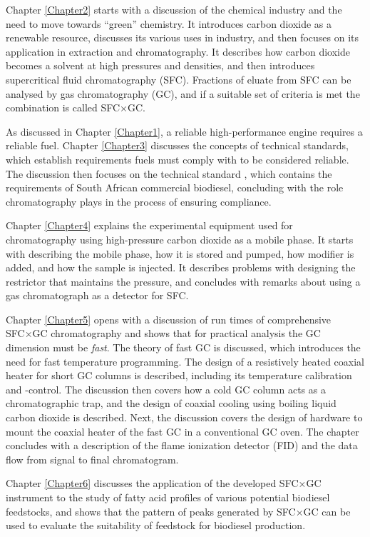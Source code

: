 Chapter \ref{Chapter2} starts with a discussion of the chemical industry and the
need to move towards ``green'' chemistry. It introduces carbon dioxide as a
renewable resource, discusses its various uses in industry, and then focuses on
its application in extraction and chromatography. It describes how carbon
dioxide becomes a solvent at high pressures and densities, and then introduces
supercritical fluid chromatography (SFC). Fractions of eluate from SFC can be
analysed by gas chromatography (GC), and if a suitable set of criteria is met
the combination is called SFC×GC.

As discussed in Chapter \ref{Chapter1}, a reliable high-performance engine
requires a reliable fuel. Chapter \ref{Chapter3} discusses the concepts of
technical standards, which establish requirements fuels must comply with to be
considered reliable. The discussion then focuses on the technical standard
, which contains the requirements of South African commercial
biodiesel, concluding with the role chromatography plays in the process of
ensuring compliance.

Chapter \ref{Chapter4} explains the experimental equipment used for
chromatography using high-pressure carbon dioxide as a mobile phase. It starts
with describing the mobile phase, how it is stored and pumped, how modifier is
added, and how the sample is injected. It describes problems with designing the
restrictor that maintains the pressure, and concludes with remarks about using a
gas chromatograph as a detector for SFC. 

Chapter \ref{Chapter5} opens with a discussion of run times of comprehensive
SFC×GC chromatography and shows that for practical analysis the GC dimension
must be \textit{fast}. The theory of fast GC is discussed, which introduces the
need for fast temperature programming. The design of a resistively heated
coaxial heater for short GC columns is described, including its temperature
calibration and -control. The discussion then covers how a cold GC column acts
as a chromatographic trap, and the design of coaxial cooling using boiling
liquid carbon dioxide is described. Next, the discussion covers the design of
hardware to mount the coaxial heater of the fast GC in a conventional GC oven.
The chapter concludes with a description of the flame ionization detector (FID)
and the data flow from signal to final chromatogram.

Chapter \ref{Chapter6} discusses the application of the developed SFC×GC
instrument to the study of fatty acid profiles of various potential biodiesel
feedstocks, and shows that the pattern of peaks generated by SFC×GC can be used
to evaluate the suitability of feedstock for biodiesel production.

